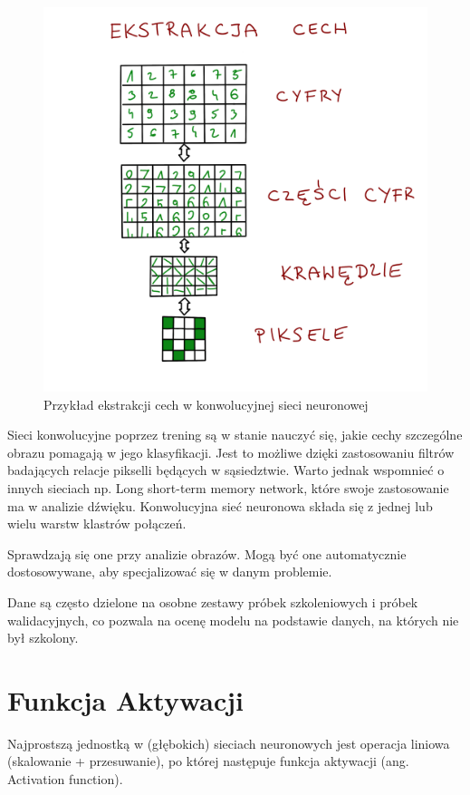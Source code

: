 \documentclass[brudnopis]{xmgr}
\begin{document}
\begin{figure}[!tbh]
\centering
\includegraphics[width=.8\hsize]{fig/10}
\caption{Przykład ekstrakcji cech w konwolucyjnej sieci neuronowej\label{RYS.2}}
\end{figure}

Sieci konwolucyjne poprzez trening są w stanie nauczyć się, jakie cechy szczególne obrazu pomagają w jego klasyfikacji. Jest to możliwe dzięki zastosowaniu filtrów badających relacje pikselli będących w sąsiedztwie. Warto jednak wspomnieć o innych sieciach np. Long short-term memory network, które swoje zastosowanie ma w analizie dźwięku. Konwolucyjna sieć neuronowa składa się z jednej lub wielu warstw klastrów połączeń.

 Sprawdzają się one przy analizie obrazów.  Mogą być one automatycznie dostosowywane, aby specjalizować się w danym problemie.

Dane są często dzielone na osobne zestawy próbek szkoleniowych i próbek walidacyjnych, co pozwala na ocenę modelu na podstawie danych, na których nie był szkolony.





\section{Funkcja Aktywacji  \label{s:dsssl}}

Najprostszą jednostką w (głębokich) sieciach neuronowych jest operacja liniowa (skalowanie + przesuwanie), po której następuje funkcja aktywacji (ang. Activation function).
\end{document}
